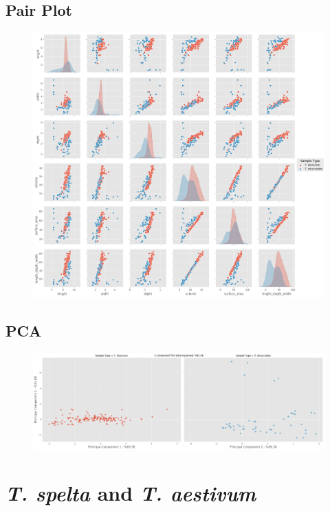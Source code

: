 \documentclass[11pt]{report}
\begin{document}
\subsection{Pair Plot}
\label{sec:org5df55c4}

\begin{figure}[htbp]
\centering
\includegraphics[width=18cm]{./images/results/group2/pairplot.png}
\label{fig:org6f3c32f}
\end{figure}

\clearpage
\subsection{PCA}
\label{sec:org7fa4efb}
\begin{figure}[htbp]
\centering
\includegraphics[width=18cm]{./images/results/group2/pca.png}
\label{fig:org54a24dc}
\end{figure}



\clearpage
\section{\emph{T. spelta} and \emph{T. aestivum}}
\label{sec:orgd89b058}
\end{document}

